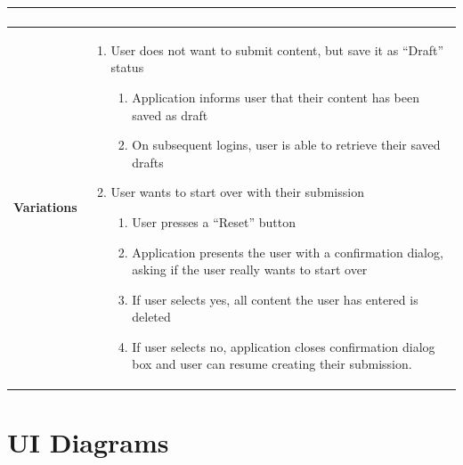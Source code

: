 \documentclass[11pt]{article}
\begin{document}
\begin{centering}
\begin{tabular}{|p{2.5cm}|p{13cm}|}
{\begin{enumerate}
{\begin{enumerate}
                \end{enumerate}
            }
        \end{enumerate}
        \vspace{-15pt}
    }\\
    \hline
    \textbf{Variations} & \parbox{\textwidth}{
        \begin{enumerate}
            \setlength\itemsep{-3pt}
            \item User does not want to submit content, but save it as ``Draft'' status\\
            \parbox{\textwidth}{
                \begin{enumerate}
                    \setlength\itemsep{-3pt}
                    \item Application informs user that their content has been saved as draft
                    \item On subsequent logins, user is able to retrieve their saved drafts
                \end{enumerate}
            }
            \item User wants to start over with their submission\\
            \parbox{\textwidth}{
                \begin{enumerate}
                    \setlength\itemsep{-3pt}
                    \item User presses a ``Reset'' button
                    \item Application presents the user with a confirmation dialog, asking \newline if the user really wants to start over
                    \item If user selects yes, all content the user has entered is deleted
                    \item If user selects no, application closes confirmation dialog box and \newline user can resume creating their submission.
                \end{enumerate}
            }
        \end{enumerate}
        \vspace{-15pt}
    }\\
    \hline
\end{tabular}

\end{centering}

\newpage

\section{UI Diagrams}
\end{document}
